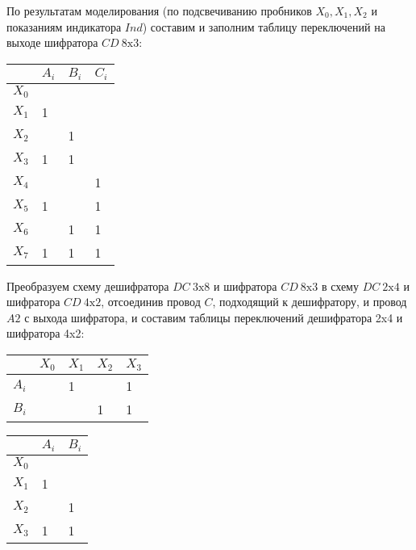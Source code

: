 \documentclass[spec, och, labwork]{shiza}
\begin{document}
По результатам моделирования (по подсвечиванию пробников $X_0,X_1,X_2$ и 
показаниям индикатора $Ind$) составим и заполним таблицу переключений на выходе
шифратора $CD ~8\text{x}3$:

\begin{table}[h]
    \begin{center}
    \begin{tabular}{|l|l|l|l|}
    \hline
          & $A_i$ & $B_i$ & $C_i$ \\ \hline
    $X_0$ &       &       &       \\ \hline
    $X_1$ & 1     &       &       \\ \hline
    $X_2$ &       & 1     &       \\ \hline
    $X_3$ & 1     & 1     &       \\ \hline
    $X_4$ &       &       & 1     \\ \hline
    $X_5$ & 1     &       & 1     \\ \hline
    $X_6$ &       & 1     & 1     \\ \hline
    $X_7$ & 1     & 1     & 1     \\ \hline
    \end{tabular}
    \end{center}
\end{table}

Преобразуем схему дешифратора $DC~3 \text{x}8$ и шифратора $CD~8\text{x}3$ в схему
$DC ~2\text{x}4$ и шифратора $CD~4\text{x}2$, отсоединив провод $C$, подходящий
к дешифратору, и провод $A2$ с выхода шифратора, и составим таблицы переключений
дешифратора 2x4 и шифратора 4x2:

\begin{table}[H]
    \begin{center}
    \begin{tabular}{|l|l|l|l|l|}
    \hline
          & $X_0$ & $X_1$ & $X_2$ & $X_3$ \\ \hline
    $A_i$ &       & 1     &       & 1     \\ \hline
    $B_i$ &       &       & 1     & 1     \\ \hline
    \end{tabular}
    \end{center}
\end{table}

\begin{table}[H]
    \begin{center}
    \begin{tabular}{|l|l|l|}
    \hline
          & $A_i$ & $B_i$ \\ \hline
    $X_0$ &       &       \\ \hline
    $X_1$ & 1     &       \\ \hline
    $X_2$ &       & 1     \\ \hline
    $X_3$ & 1     & 1     \\ \hline
    \end{tabular}
    \end{center}
\end{table}
\end{document}
